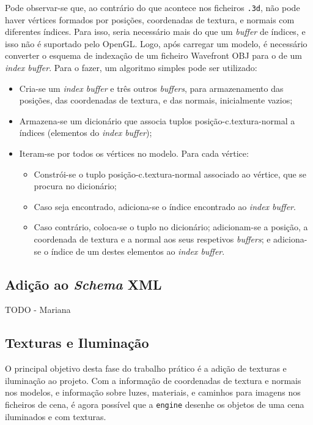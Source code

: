 \documentclass[12pt, a4paper]{article}
\begin{document}
Pode observar-se que, ao contrário do que acontece nos ficheiros \texttt{.3d}, não pode haver
vértices formados por posições, coordenadas de textura, e normais com diferentes índices. Para isso,
seria necessário mais do que um \emph{buffer} de índices, e isso não é suportado pelo OpenGL. Logo,
após carregar um modelo, é necessário converter o esquema de indexação de um ficheiro Wavefront OBJ
para o de um \emph{index buffer}. Para o fazer, um algoritmo simples pode ser utilizado:

\begin{itemize}
    \item Cria-se um \emph{index buffer} e três outros \emph{buffers}, para armazenamento das
        posições, das coordenadas de textura, e das normais, inicialmente vazios;

    \item Armazena-se um dicionário que associa tuplos posição-c.textura-normal a índices (elementos
        do \emph{index buffer});

    \item Iteram-se por todos os vértices no modelo. Para cada vértice:
        \begin{itemize}
            \item Constrói-se o tuplo posição-c.textura-normal associado ao vértice, que se procura
                no dicionário;
            \item Caso seja encontrado, adiciona-se o índice encontrado ao \emph{index buffer}.
            \item Caso contrário, coloca-se o tuplo no dicionário; adicionam-se a posição, a
                coordenada de textura e a normal aos seus respetivos \emph{buffers}; e adiciona-se o
                índice de um destes elementos ao \emph{index buffer}.
        \end{itemize}
\end{itemize}

\subsection{Adição ao \emph{Schema} XML}

{\color{red} TODO - Mariana}

\subsection{Texturas e Iluminação}

O principal objetivo desta fase do trabalho prático é a adição de texturas e iluminação ao projeto.
Com a informação de coordenadas de textura e normais nos modelos, e informação sobre luzes,
materiais, e caminhos para imagens nos ficheiros de cena, é agora possível que a \texttt{engine}
desenhe os objetos de uma cena iluminados e com texturas.
\end{document}
